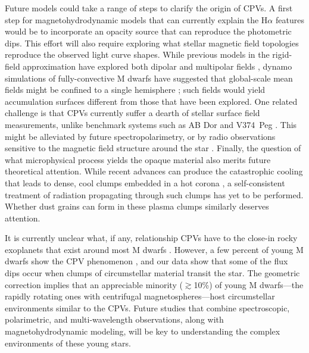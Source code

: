 \documentclass[11pt,twocolumn,tighten]{aastex7}
\begin{document}
Future models could take a range of steps to clarify the origin
of CPVs.  A first step for magnetohydrodynamic models that can
currently explain the H$\alpha$ features \citep[e.g.][]{Waugh2022}
would be to incorporate an opacity source that can reproduce the
photometric dips.  This effort will also require
exploring what stellar magnetic field topologies reproduce the
observed light curve shapes.  While previous
models in the rigid-field approximation have explored both dipolar
\citep{Townsend2008} and multipolar fields \citep{Krticka2022}, dynamo
simulations of fully-convective M dwarfs have suggested that
global-scale mean fields might be confined to a single hemisphere
\citep{Brown2020}; such fields would yield accumulation surfaces 
different from those that have been explored.  One related challenge
is that CPVs currently suffer a dearth of stellar surface field
measurements, unlike benchmark systems such as AB Dor and V374~Peg
\citep{Jardine2002,Vidotto2011}. This might be alleviated by
future spectropolarimetry, or by radio observations
sensitive to the magnetic field structure around the star
\citep[][]{Callingham2021,Kaur2024}.  Finally, the question of what
microphysical process yields the opaque material also merits future
theoretical attention. While recent advances can produce the
catastrophic cooling that leads to dense, cool clumps embedded in a
hot corona \citep{Daley-Yates2023,Daley-Yates2024}, a self-consistent
treatment of radiation propagating through such clumps has yet to be
performed. Whether dust grains can form in these plasma clumps
similarly deserves attention.

It is currently unclear what, if any, relationship CPVs have to the
close-in rocky exoplanets that exist around most M dwarfs
\citep{Dressing2015}.  However, a few percent of young M dwarfs show
the CPV phenomenon \citep{Rebull2020}, and our data show that some of
the flux dips occur when clumps of circumstellar material transit the
star.  The geometric correction implies that an appreciable minority
($\gtrsim$10\%) of young M dwarfs---the rapidly rotating ones with
centrifugal magnetospheres---host circumstellar environments similar
to the CPVs.  Future studies that combine spectroscopic, polarimetric,
and multi-wavelength observations, along with magnetohydrodynamic
modeling, will be key to understanding the complex environments of
these young stars.
\end{document}
